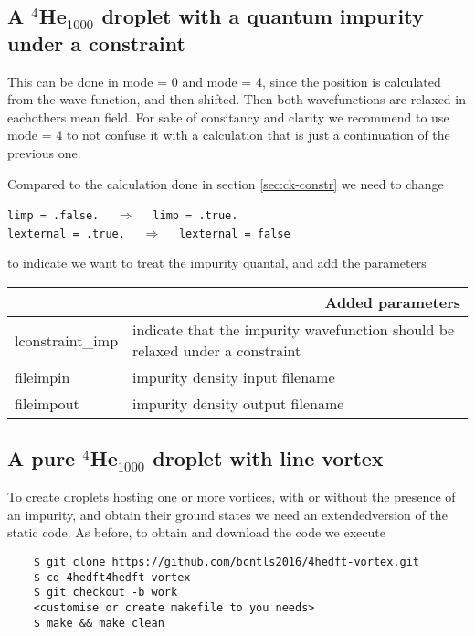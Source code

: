 \documentclass[10pt,a4paper]{article}
\begin{document}
	\subsection{A $^4$He$_{1000}$ droplet with a quantum impurity under a constraint}
	
	This can be done in mode = 0 and mode = 4, since the position is calculated from the wave function, and then shifted. Then both wavefunctions are relaxed in eachothers mean field. For sake of consitancy and clarity we recommend to use mode = 4 to not confuse it with a calculation that is just a continuation of the previous one.
	
	Compared to the calculation done in section \ref{sec:ck-constr} we need to change
	
		\begin{center}
		\verb|limp = .false.|	$\quad\Longrightarrow\quad$	\verb|limp = .true.| \\
		\verb|lexternal = .true.|	$\quad\Longrightarrow\quad$	\verb|lexternal = false|
	\end{center}
	
	to indicate we want to treat the impurity quantal, and add the parameters
	
	\begin{center}
		\begin{tabular}{l|p{9.75cm}}
			\multicolumn{2}{r}{\textbf{Added parameters}} \\
			\hline\hline
			 lconstraint\_imp			&  indicate that the impurity wavefunction should be relaxed under a constraint  \\
			 fileimpin		&	impurity density input filename \\
			 fileimpout		&	impurity density output filename
		\end{tabular}
	\end{center}
	
	\subsection{A pure $^4$He$_{1000}$ droplet with line vortex}
	To create droplets hosting one or more vortices, with or without the presence of an impurity, and obtain their ground states we need an extendedversion of the static code. As before, to obtain and download the code we execute
	\begin{verbatim}
	$ git clone https://github.com/bcntls2016/4hedft-vortex.git
	$ cd 4hedft4hedft-vortex
	$ git checkout -b work
	<customise or create makefile to you needs>
	$ make && make clean
	\end{verbatim}
	
\end{document}
